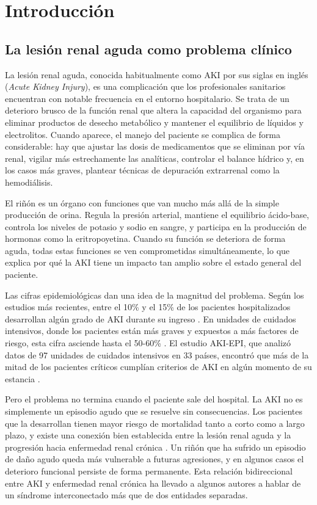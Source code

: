 \documentclass[12pt, a4paper, oneside]{report}
\begin{document}
\chapter{Introducción}
\label{chap:introduccion}

\section{La lesión renal aguda como problema clínico}

La lesión renal aguda, conocida habitualmente como AKI por sus siglas en inglés (\textit{Acute Kidney Injury}), es una complicación que los profesionales sanitarios encuentran con notable frecuencia en el entorno hospitalario. Se trata de un deterioro brusco de la función renal que altera la capacidad del organismo para eliminar productos de desecho metabólico y mantener el equilibrio de líquidos y electrolitos. Cuando aparece, el manejo del paciente se complica de forma considerable: hay que ajustar las dosis de medicamentos que se eliminan por vía renal, vigilar más estrechamente las analíticas, controlar el balance hídrico y, en los casos más graves, plantear técnicas de depuración extrarrenal como la hemodiálisis.

El riñón es un órgano con funciones que van mucho más allá de la simple producción de orina. Regula la presión arterial, mantiene el equilibrio ácido-base, controla los niveles de potasio y sodio en sangre, y participa en la producción de hormonas como la eritropoyetina. Cuando su función se deteriora de forma aguda, todas estas funciones se ven comprometidas simultáneamente, lo que explica por qué la AKI tiene un impacto tan amplio sobre el estado general del paciente.

Las cifras epidemiológicas dan una idea de la magnitud del problema. Según los estudios más recientes, entre el 10\% y el 15\% de los pacientes hospitalizados desarrollan algún grado de AKI durante su ingreso \parencite{hoste2018epidemiology}. En unidades de cuidados intensivos, donde los pacientes están más graves y expuestos a más factores de riesgo, esta cifra asciende hasta el 50-60\% \parencite{hoste2015akiepi}. El estudio AKI-EPI, que analizó datos de 97 unidades de cuidados intensivos en 33 países, encontró que más de la mitad de los pacientes críticos cumplían criterios de AKI en algún momento de su estancia \parencite{hoste2015akiepi}.

Pero el problema no termina cuando el paciente sale del hospital. La AKI no es simplemente un episodio agudo que se resuelve sin consecuencias. Los pacientes que la desarrollan tienen mayor riesgo de mortalidad tanto a corto como a largo plazo, y existe una conexión bien establecida entre la lesión renal aguda y la progresión hacia enfermedad renal crónica \parencite{chawla2014akickd}. Un riñón que ha sufrido un episodio de daño agudo queda más vulnerable a futuras agresiones, y en algunos casos el deterioro funcional persiste de forma permanente. Esta relación bidireccional entre AKI y enfermedad renal crónica ha llevado a algunos autores a hablar de un síndrome interconectado más que de dos entidades separadas.
\end{document}
